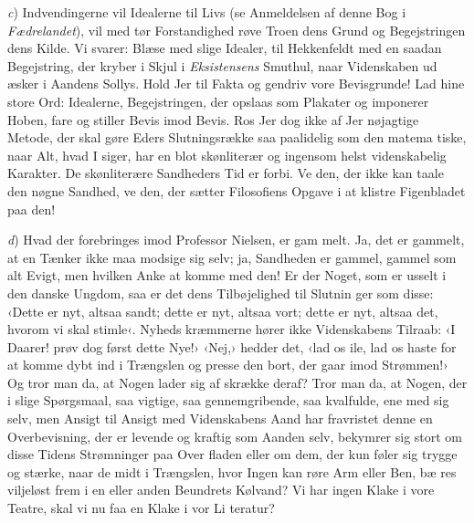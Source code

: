 \documentclass[12pt,a4paper,openany]{book}
\newcommand{\opage}[1]{\marginnote{\footnotesize\textit{[#1]}}}
\begin{document}
\emph{c}) Indvendingerne vil Idealerne til Livs (se Anmeldelsen af
denne Bog i \emph{Fædrelandet}), vil med tør Forstandighed røve
Troen dens Grund og Begejstringen dens Kilde. Vi svarer: Blæse
med slige Idealer, til Hekkenfeldt med en saadan Begejstring,
der kryber i Skjul i \emph{Eksistensens} Smuthul, naar Videnskaben ud\-%
æsker i Aandens Sollys. Hold Jer til Fakta og gendriv vore
Bevisgrunde! Lad hine store Ord: Idealerne, Begejstringen, der
opslaas som Plakater og imponerer Hoben, fare og stiller Bevis
imod Bevis. Ros Jer dog ikke af Jer nøjagtige Metode, der
skal gøre Eders Slutningsrække saa paalidelig som den matema\-%
tiske, naar Alt, hvad I siger, har en blot skønliterær og ingensom\-%
helst videnskabelig Karakter. De skønliterære Sandheders Tid er
forbi. Ve den, der ikke kan taale den nøgne Sandhed, ve den,
der sætter Filosofiens Opgave i at klistre Figenbladet paa den!

\emph{d}) Hvad der forebringes imod Professor Nielsen, er gam\-%
melt. Ja, det er gammelt, at en Tænker ikke maa modsige sig
selv; ja, Sandheden er gammel, gammel som alt Evigt, men
hvilken Anke at komme med den! Er der Noget, som er usselt
i den danske Ungdom, saa er det dens Tilbøjelighed til Slutnin\-%
ger som disse: ‹Dette er nyt, altsaa sandt; dette er nyt, altsaa
vort; dette er nyt, altsaa det, hvorom vi skal stimle‹. Nyheds\-%
kræmmerne hører ikke Videnskabens Tilraab: ‹I Daarer! prøv
dog først dette Nye!› ‹Nej,› hedder det, ‹lad os ile, lad os haste
for at komme dybt ind i Trængslen og presse den bort, der
gaar imod Strømmen!› Og tror man da, at Nogen lader sig af\-%
skrække deraf? Tror man da, at Nogen, der i slige Spørgsmaal,
saa vigtige, saa gennemgribende, saa kvalfulde, ene med sig selv,
men Ansigt til Ansigt med Videnskabens Aand har fravristet
denne en Overbevisning, der er levende og kraftig som Aanden
selv, bekymrer sig stort om disse Tidens Strømninger paa Over%
\opage{96}fladen eller om dem, der kun føler sig trygge og stærke, naar
de midt i Trængslen, hvor Ingen kan røre Arm eller Ben, bæ\-%
res viljeløst frem i en eller anden Beundrets Kølvand? Vi har
ingen Klake i vore Teatre, skal vi nu faa en Klake i vor Li\-%
teratur?
\end{document}
